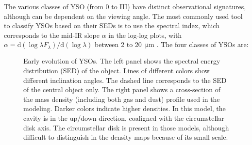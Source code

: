 The various classes of YSO (from 0 to III) have distinct observational signatures, although can be dependent on the viewing angle. The most commonly used tool to classify YSOs based on their SEDs is to use the spectral index, which corresponds to the mid-IR slope $\alpha$ in the log-log plots, with $\alpha = \textrm{d}(\log\lambda F_\lambda)/\textrm{d}(\log\lambda)$ between 2 to \SI{20}{\micro\meter} \citep{McKee:2007bd}. The four classes of YSOs are:


\begin{figure}[!h]
\begin{center}
 \par\medskip
{} 
\caption[Early evolution of YSOs]{Early evolution of YSOs. The left panel shows the spectral energy distribution (SED) of the object. Lines of different colors show different inclination angles. The dashed line corresponds to the SED of the central object only. The right panel shows a cross-section of the mass density (including both gas and dust) profile used in the modeling. Darker colors indicate higher densities. In this model, the cavity is in the up/down direction, coaligned with the circumstellar disk axis. The circumstellar disk is present in those models, although difficult to distinguish in the density maps because of its small scale.}
\label{fig:EarlyStages}
\end{center}
\end{figure}

